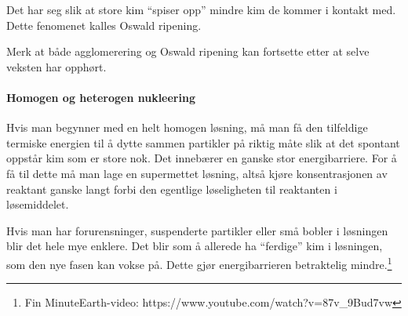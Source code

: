 Det har seg slik at store kim ``spiser opp'' mindre kim de kommer i kontakt med. Dette fenomenet kalles Oswald ripening.

Merk at både agglomerering og Oswald ripening kan fortsette etter at selve veksten har opphørt.

\paragraph{Homogen og heterogen nukleering} Hvis man begynner med en helt homogen løsning, må man få den tilfeldige termiske energien til å dytte sammen partikler på riktig måte slik at det spontant oppstår kim som er store nok. Det innebærer en ganske stor energibarriere. For å få til dette må man lage en supermettet løsning, altså kjøre konsentrasjonen av reaktant ganske langt forbi den egentlige løseligheten til reaktanten i løsemiddelet.

Hvis man har forurensninger, suspenderte partikler eller små bobler i løsningen blir det hele mye enklere. Det blir som å allerede ha ``ferdige'' kim i løsningen, som den nye fasen kan vokse på. Dette gjør energibarrieren betraktelig mindre.\footnote{Fin MinuteEarth-video: https://www.youtube.com/watch?v=87v_9Bud7vw}



